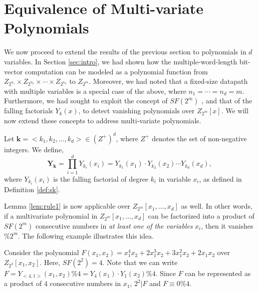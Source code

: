 \section{Equivalence of Multi-variate Polynomials}\label{sec:multivar}
We now proceed to extend the results of the previous section to
polynomials in $d$ variables. In Section \ref{sec:intro}, we had shown
how the multiple-word-length bit-vector computation can be modeled as
a polynomial function from $Z_{2^{n_1}}\times Z_{2^{n_2}} \times
\cdots \times Z_{2^{n_d}}$ to $Z_{2^{m}}$.  Moreover, we had noted
that a fixed-size datapath with multiple variables is a special case
of the above, where $n_1 = \cdots = n_d = m$. Furthermore, we had
sought to exploit the concept of $SF(2^m)$ , and that of the falling
factorials $Y_k(x)$, to detect vanishing polynomials over
$Z_{2^m}[x]$. We will now extend these concepts to address
multi-variate polynomials. 


\begin{Definition}
Let $\textbf{k} = <k_1, k_2, \ldots , k_d> \in (Z^+)^d$, where $Z^+$
denotes the set of non-negative integers. We define,
\begin{equation}\label{eqn:falling_fact}
\textbf{Y}_\textbf{k} = \prod_{i=1}^{d}Y_{k_i}(x_i) = Y_{k_1}(x_1)
\cdot Y_{k_2}(x_2) \cdots Y_{k_d}(x_d),
\end{equation}
where $Y_{k_i}(x_i)$ is the falling factorial of degree $k_i$ in
variable $x_i$, as defined in Definition \ref{def:sk}.
\end{Definition}

Lemma \ref{lem:rule1} is now applicable over $Z_{2^m}[x_1, \ldots,
  x_d]$ as well. In other words, if a multivariate polynomial in
  $Z_{2^m}[x_1, \ldots, x_d]$ can be factorized into a product of
  $SF(2^m)$ consecutive numbers in {\it at least one of the variables}
  $x_i$, then it vanishes $\%2^m$. The following example illustrates
  this idea.

\begin{Example}\label{ex:ff1}
Consider the polynomial $F(x_1, x_2) = x_1^4 x_2 + 2x_1^3 x_2 + 3x_1^2
x_2 + 2x_1 x_2$ over $Z_{2^2}[x_1, x_2]$. Here, $SF(2^2) = 4$. 
Note that we can write %
$F = Y_{<4,1>}(x_1, x_2) \%4 = Y_{4}(x_1)\cdot Y_{1}(x_2) \%4$. Since
$F$ can be represented as a product of $4$ consecutive numbers in
$x_1$, $2^2|F$ and $F \equiv 0 \%4$. 
\end{Example}

